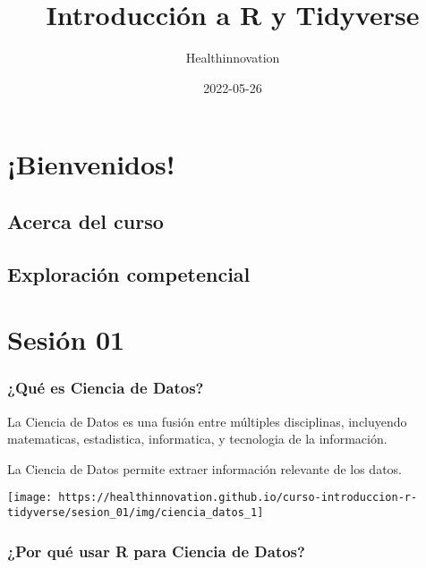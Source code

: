 \documentclass[
]{book}
\title{Introducción a R y Tidyverse}
\author{Healthinnovation}
\date{2022-05-26}
\begin{document}
\maketitle

{
\setcounter{tocdepth}{1}
\tableofcontents
}
\hypertarget{bienvenidos}{%
\chapter{¡Bienvenidos!}\label{bienvenidos}}

\hypertarget{acerca-del-curso}{%
\section{Acerca del curso}\label{acerca-del-curso}}

\hypertarget{exploraciuxf3n-competencial}{%
\section{Exploración competencial}\label{exploraciuxf3n-competencial}}

\hypertarget{sesiuxf3n-01}{%
\chapter{Sesión 01}\label{sesiuxf3n-01}}

\hypertarget{quuxe9-es-ciencia-de-datos}{%
\subsection{¿Qué es Ciencia de Datos?}\label{quuxe9-es-ciencia-de-datos}}

La Ciencia de Datos es una fusión entre múltiples disciplinas, incluyendo matematicas, estadistica, informatica, y tecnologia de la información.

La Ciencia de Datos permite extraer información relevante de los datos.

\begin{center}\texttt{[image: https://healthinnovation.github.io/curso-introduccion-r-tidyverse/sesion\_01/img/ciencia\_datos\_1]} \end{center}

\hypertarget{por-quuxe9-usar-r-para-ciencia-de-datos}{%
\subsection{¿Por qué usar R para Ciencia de Datos?}\label{por-quuxe9-usar-r-para-ciencia-de-datos}}
\end{document}
